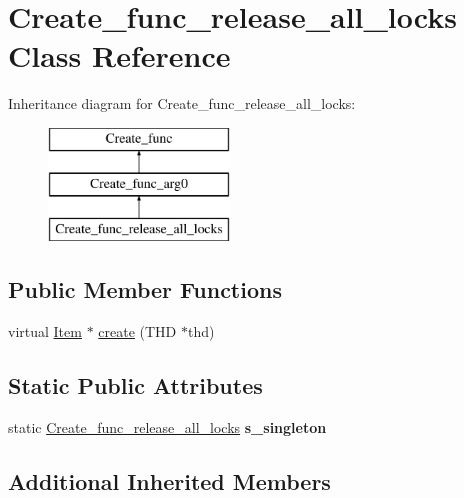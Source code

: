 \hypertarget{classCreate__func__release__all__locks}{}\section{Create\+\_\+func\+\_\+release\+\_\+all\+\_\+locks Class Reference}
\label{classCreate__func__release__all__locks}
Inheritance diagram for Create\+\_\+func\+\_\+release\+\_\+all\+\_\+locks\+:\begin{figure}[H]
\begin{center}
\leavevmode
\includegraphics[height=3.000000cm]{classCreate__func__release__all__locks}
\end{center}
\end{figure}
\subsection*{Public Member Functions}
\begin{DoxyCompactItemize}
\item 
virtual \mbox{\hyperlink{classItem}{Item}} $\ast$ \mbox{\hyperlink{classCreate__func__release__all__locks_a2bbdf262c75f30639a451101c8e182a6}{create}} (T\+HD $\ast$thd)
\end{DoxyCompactItemize}
\subsection*{Static Public Attributes}
\begin{DoxyCompactItemize}
\item 
\mbox{\label{classCreate__func__release__all__locks_a458b4a23ec9d79cc3ca4a545556e0dd7}} 
static \mbox{\hyperlink{classCreate__func__release__all__locks}{Create\+\_\+func\+\_\+release\+\_\+all\+\_\+locks}} {\bfseries s\+\_\+singleton}
\end{DoxyCompactItemize}
\subsection*{Additional Inherited Members}


